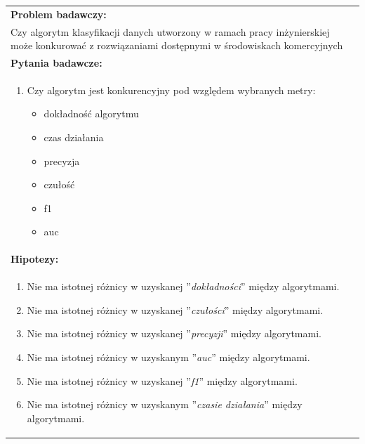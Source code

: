 \begin{table}[H]
    \centering
    \begin{tabular}{|L{\textwidth}|}
        \hline
        \textbf{Problem badawczy:} \\
        Czy algorytm klasyfikacji danych utworzony w ramach pracy inżynierskiej może konkurować z rozwiązaniami dostępnymi w środowiskach komercyjnych \\ \hline

        \textbf{Pytania badawcze:} \\
        \begin{enumerate}
            \item Czy algorytm jest konkurencyjny pod względem wybranych metry:
            \begin{itemize}
                \item dokładność algorytmu
                \item czas działania
                \item precyzja
                \item czułość
                \item f1
                \item auc
            \end{itemize}
        \end{enumerate} \\ \hline

        \textbf{Hipotezy:} \\
        \begin{enumerate}
            \item Nie ma istotnej różnicy w uzyskanej ''\textit{dokładności}'' między algorytmami.
            \item Nie ma istotnej różnicy w uzyskanej ''\textit{czułości}'' między algorytmami.
            \item Nie ma istotnej różnicy w uzyskanej ''\textit{precyzji}'' między algorytmami.
            \item Nie ma istotnej różnicy w uzyskanym ''\textit{auc}'' między algorytmami.
            \item Nie ma istotnej różnicy w uzyskanej ''\textit{f1}'' między algorytmami.
            \item Nie ma istotnej różnicy w uzyskanym ''\textit{czasie działania}'' między algorytmami.
        \end{enumerate} \\ \hline
    \end{tabular}
    \label{tab:met-bad}
\end{table}

